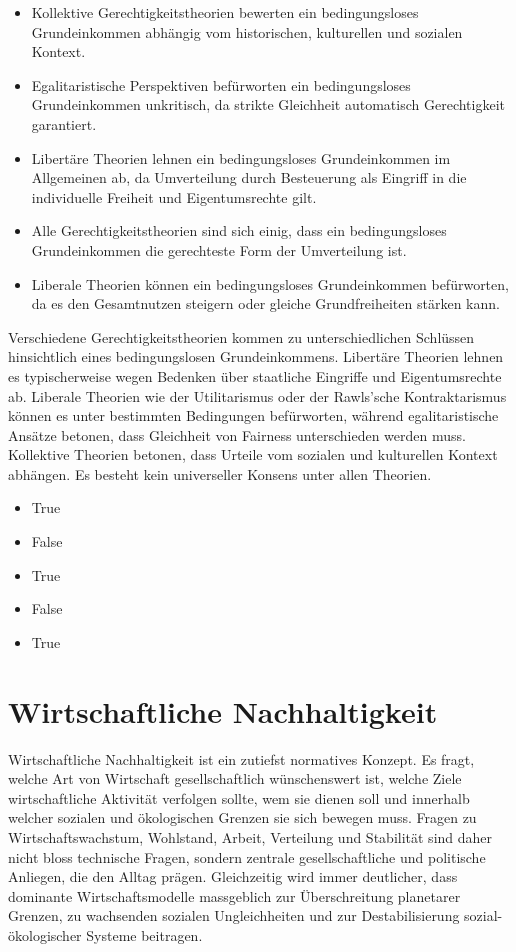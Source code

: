 \documentclass[
  nswissgerman,
  a4paper,
  DIV=11,
  numbers=noendperiod,
  oneside,
  openany]{scrreprt}
\providecommand{\tightlist}{%
  \setlength{\itemsep}{0pt}\setlength{\parskip}{0pt}}
\begin{document}
\begin{itemize}
\tightlist
\item[$\square$]
  Kollektive Gerechtigkeitstheorien bewerten ein bedingungsloses
  Grundeinkommen abhängig vom historischen, kulturellen und sozialen
  Kontext.
\item[$\square$]
  Egalitaristische Perspektiven befürworten ein bedingungsloses
  Grundeinkommen unkritisch, da strikte Gleichheit automatisch
  Gerechtigkeit garantiert.
\item[$\square$]
  Libertäre Theorien lehnen ein bedingungsloses Grundeinkommen im
  Allgemeinen ab, da Umverteilung durch Besteuerung als Eingriff in die
  individuelle Freiheit und Eigentumsrechte gilt.
\item[$\square$]
  Alle Gerechtigkeitstheorien sind sich einig, dass ein bedingungsloses
  Grundeinkommen die gerechteste Form der Umverteilung ist.
\item[$\square$]
  Liberale Theorien können ein bedingungsloses Grundeinkommen
  befürworten, da es den Gesamtnutzen steigern oder gleiche
  Grundfreiheiten stärken kann.
\end{itemize}

Verschiedene Gerechtigkeitstheorien kommen zu unterschiedlichen
Schlüssen hinsichtlich eines bedingungslosen Grundeinkommens. Libertäre
Theorien lehnen es typischerweise wegen Bedenken über staatliche
Eingriffe und Eigentumsrechte ab. Liberale Theorien wie der
Utilitarismus oder der Rawls'sche Kontraktarismus können es unter
bestimmten Bedingungen befürworten, während egalitaristische Ansätze
betonen, dass Gleichheit von Fairness unterschieden werden muss.
Kollektive Theorien betonen, dass Urteile vom sozialen und kulturellen
Kontext abhängen. Es besteht kein universeller Konsens unter allen
Theorien.

\begin{itemize}
\tightlist
\item
  True
\item
  False
\item
  True
\item
  False
\item
  True
\end{itemize}

\chapter{Wirtschaftliche
Nachhaltigkeit}\label{wirtschaftliche-nachhaltigkeit}

Wirtschaftliche Nachhaltigkeit ist ein zutiefst normatives Konzept. Es
fragt, welche Art von Wirtschaft gesellschaftlich wünschenswert ist,
welche Ziele wirtschaftliche Aktivität verfolgen sollte, wem sie dienen
soll und innerhalb welcher sozialen und ökologischen Grenzen sie sich
bewegen muss. Fragen zu Wirtschaftswachstum, Wohlstand, Arbeit,
Verteilung und Stabilität sind daher nicht bloss technische Fragen,
sondern zentrale gesellschaftliche und politische Anliegen, die den
Alltag prägen. Gleichzeitig wird immer deutlicher, dass dominante
Wirtschaftsmodelle massgeblich zur Überschreitung planetarer Grenzen, zu
wachsenden sozialen Ungleichheiten und zur Destabilisierung
sozial-ökologischer Systeme beitragen.
\end{document}
